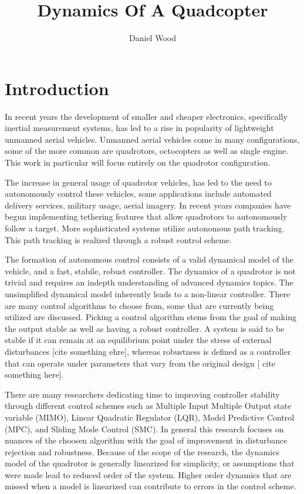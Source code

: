 \documentclass[9pt]{article}
\begin{document}
\title{Dynamics Of A Quadcopter}
\author{Daniel Wood}
\maketitle
\section{Introduction}

In recent years the development of smaller and cheaper electronics, specifically inertial measurement systems, has led to a rise in popularity of lightweight unmanned aerial vehicles. Unmanned aerial vehicles come in many configurations, some of the more common are quadrotors, octocopters as well as single engine. This work in particular will focus entirely on the quadrotor configuration. 

The increase in general usage of quadrotor vehicles, has led to the need to autonomously control these vehicles, some applications include automated delivery services, military usage, aerial imagery. In recent years companies have begun implementing tethering features that allow quadrotors to autonomously follow a target. More sophisticated systems utilize autonomous path tracking. This path tracking is realized through a robust control scheme.

The formation of autonomous control consists of a valid dynamical model of the vehicle, and a fast, stabile, robust controller. The dynamics of a quadrotor is not trivial and requires an indepth understanding of advanced dynamics topics. The unsimplified dynamical model inherently leads to a non-linear controller. There are many control algorithms to choose from, some that are currently being utilized are discussed. Picking a control algorithm stems from the goal of making the output stable as well as having a robust controller. A system is said to be stable if it can remain at an equilibrium point under the stress of external disturbances [cite something ehre], whereas robustness is defined as a controller that can operate under parameters that vary from the original design [ cite something here].

There are many researchers dedicating time to improving controller stability through different control schemes such as Multiple Input Multiple Output state variable (MIMO)\cite{FarameeVeeravat2014EotS}, Linear Quadratic Regulator (LQR), Model Predictive Control (MPC), and Sliding Mode Control (SMC). In general this research focuses on nuances of the choosen algorithm with the goal of improvement in disturbance rejection\cite{DenisKotarski2016CDFU} and robustness. Because of the scope of the research, the dynamics model of the quadrotor is generally linearized for simplicity, or assumptions that were made lead to reduced order of the system\cite{FarameeVeeravat2014EotS}. Higher order dynamics that are missed when a model is linearized can contribute to errors in the control scheme. 
\end{document}
